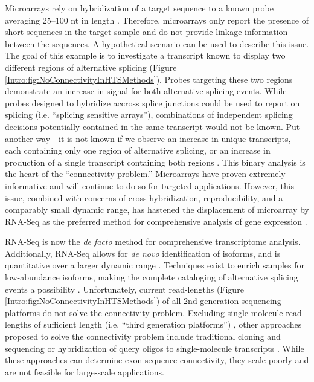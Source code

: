     Microarrays rely on hybridization of a target sequence to a known probe averaging 25--100 nt in length \citep{Southern2001}. Therefore, microarrays only report the presence of short sequences in the target sample and do not provide linkage information between the sequences. A hypothetical scenario can be used to describe this issue. The goal of this example is to investigate a transcript known to display two different regions of alternative splicing (Figure \ref{Intro:fig:NoConnectivityInHTSMethods}). Probes targeting these two regions demonstrate an increase in signal for both alternative splicing events. While probes designed to hybridize accross splice junctions could be used to report on splicing (i.e. ``splicing sensitive arrays''), combinations of independent splicing decisions potentially contained in the same transcript would not be known. Put another way - it is not known if we observe an increase in unique transcripts, each containing only one region of  alternative splicing, or an increase in production of a single transcript containing both regions \citep{Calarco2007}. This binary analysis is the heart of the ``connectivity problem.'' Microarrays have proven extremely informative and will continue to do so for targeted applications. However, this issue, combined with concerns of cross-hybridization, reproducibility, and a comparably small dynamic range, has hastened the displacement of microarray by RNA-Seq as the preferred method for comprehensive analysis of gene expression \citep{Shendure2008}.

    RNA-Seq is now the \textit{de facto} method for comprehensive transcriptome analysis. Additionally, RNA-Seq allows for \textit{de novo} identification of isoforms, and is quantitative over a larger dynamic range \citep{Mortazavi2008}. Techniques exist to enrich samples for low-abundance isoforms, making the complete cataloging of alternative splicing events a possibility \citep{Djebali2008, Salehi-Ashtiani2008}. Unfortunately, current read-lengths (Figure \ref{Intro:fig:NoConnectivityInHTSMethods}) of all 2nd generation sequencing platforms do not solve the connectivity problem. Excluding single-molecule read lengths of sufficient length (i.e. ``third generation platforms'') \citep{Shendure2004}, other approaches proposed to solve the connectivity problem include traditional cloning and sequencing or hybridization of query oligos to single-molecule transcripts \citep{Zhu2003, Calarco2007, Emerick2007}. While these approaches can determine exon sequence connectivity, they scale poorly and are not feasible for large-scale applications.

